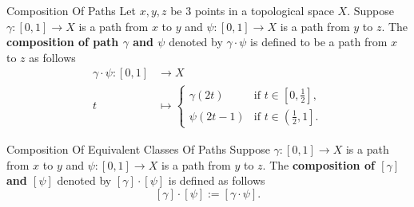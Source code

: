\documentclass{report}
\begin{document}
\begin{definition}{Composition Of Paths}{}
	Let $x,y,z$ be $3$ points in a topological space $X$. Suppose $\gamma: [0,1] \longrightarrow X$ is a path from $x$ to $y$ and $\psi: [0,1] \longrightarrow X$ is a path from $y$ to $z$. The \textbf{composition of path $\gamma$ and $\psi$} denoted by $\gamma\cdot \psi$ is defined to be a path from $x$ to $z$ as follows
	\begin{align*}
		\gamma\cdot \psi:[0,1] & \longrightarrow X                                                                            \\
		t                      & \longmapsto \begin{cases}
			                                     \gamma(2t) & \text{if }t\in\left[0,\frac{1}{2}\right],               \\
			                                     \psi(2t-1) & \text{if }t\in\left(\left.\frac{1}{2},1\right]\right. .
		                                     \end{cases}
	\end{align*}
\end{definition}

\begin{definition}{Composition Of Equivalent Classes Of Paths}{}
	Suppose $\gamma: [0,1] \longrightarrow X$ is a path from $x$ to $y$ and $\psi: [0,1] \longrightarrow X$ is a path from $y$ to $z$. The \textbf{composition of $[\gamma]$ and $[\psi]$} denoted by $[\gamma]\cdot [\psi]$ is defined as follows
	\[
		[\gamma]\cdot [\psi]:=[\gamma\cdot \psi].
	\]
\end{definition}
\end{document}
